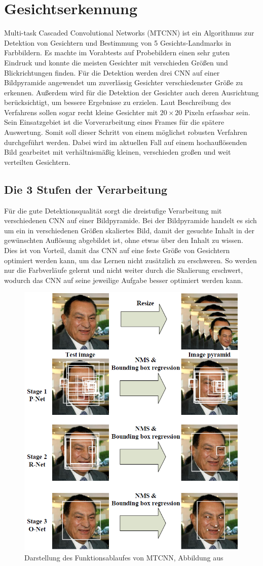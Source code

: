 \section{Gesichtserkennung}
\label{MTCNN}
Multi-task Cascaded Convolutional Networks (MTCNN) ist ein Algorithmus zur Detektion von Gesichtern und Bestimmung von 5 Gesichts-Landmarks in Farbbildern. Es machte im Vorabtests auf Probebildern einen sehr guten Eindruck und konnte die meisten Gesichter mit verschieden Größen und Blickrichtungen finden. Für die Detektion werden drei CNN auf einer Bildpyramide angewendet um zuverlässig Gesichter verschiedenster Größe zu erkennen. Außerdem wird für die Detektion der Gesichter auch deren Ausrichtung berücksichtigt, um bessere Ergebnisse zu erzielen. Laut Beschreibung des Verfahrens sollen sogar recht kleine Gesichter mit $20\times 20$ Pixeln erfassbar sein.\\
Sein Einsatzgebiet ist die Vorverarbeitung eines Frames für die spätere Auswertung. Somit soll dieser Schritt von einem möglichst robusten Verfahren durchgeführt werden. Dabei wird im aktuellen Fall auf einem hochauflösenden Bild gearbeitet mit verhältnismäßig kleinen, verschieden großen und weit verteilten Gesichtern.
\subsection{Die 3 Stufen der Verarbeitung}
Für die gute Detektionsqualität sorgt die dreistufige Verarbeitung mit verschiedenen CNN auf einer Bildpyramide. Bei der Bildpyramide handelt es sich um ein in verschiedenen Größen skaliertes Bild, damit der gesuchte Inhalt in der gewünschten Auflösung abgebildet ist, ohne etwas über den Inhalt zu wissen.\\
Dies ist von Vorteil, damit das CNN auf eine feste Größe von Gesichtern optimiert werden kann, um das Lernen nicht zusätzlich zu erschweren. So werden nur die Farbverläufe gelernt und nicht weiter durch die Skalierung erschwert, wodurch das CNN auf seine jeweilige Aufgabe besser optimiert werden kann.
\begin{figure}
	\centering
	\includegraphics[width=0.5\linewidth]{img/MTCNN_Step}
	\caption{Darstellung des Funktionsablaufes von MTCNN, Abbildung aus \cite{MTCCN}}
	\label{img_MTCNN_Step}
\end{figure}
